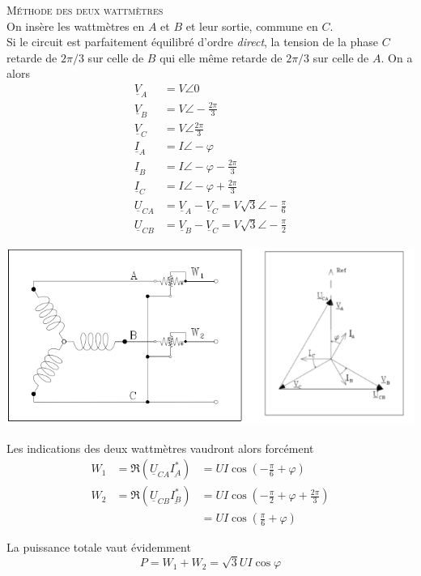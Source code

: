 			\textsc{Méthode des deux wattmètres}\\
			On insère les wattmètres en $A$ et $B$ et leur sortie, commune 
			en $C$.\\
			Si le circuit est parfaitement équilibré d'ordre \textit{direct}, 
			la tension de la phase $C$ retarde de $2\pi/3$ sur celle de $B$ 
			qui elle même retarde de $2\pi/3$ sur celle de $A$. On a alors
			\begin{equation}
			\begin{array}{lll}
			\underline{V}_A &= V \angle 0\\
			\underline{V}_B &= V\angle-\frac{2\pi}{3}\\
			\underline{V}_C &= V\angle\frac{2\pi}{3}\\
			\underline{I}_A &= I\angle-\varphi\\
			\underline{I}_B &= I\angle-\varphi-\frac{2\pi}{3}\\
			\underline{I}_C &= I\angle-\varphi+\frac{2\pi}{3}\\
			\underline{U}_{CA} &= \underline{V}_A-\underline{V}_C = V\sqrt{3}
			\angle-\frac{\pi}{6}\\
			\underline{U}_{CB} &= \underline{V}_B-\underline{V}_C = V\sqrt{3
			}\angle-\frac{\pi}{2}			
			\end{array}
			\end{equation}
				\begin{center}
		\includegraphics[scale=0.5]{ch1/image14.png}
		\end{center}
			Les indications des deux wattmètres vaudront alors forcément
			\begin{equation}
			\begin{array}{lll}
			W_1 &= \Re(\underline{U}_{CA}\underline{I_A^*}) &= UI\cos(-\frac{\pi}{
			6}+\varphi)\\
			W_2 &= \Re(\underline{U}_{CB}\underline{I_B^*}) &= UI\cos(-\frac{\pi}{
			2}+\varphi+\frac{2\pi}{3})	\\
			& &= UI\cos(\frac{\pi}{6}+\varphi)
			\end{array}
			\end{equation}
			
			La puissance totale vaut évidemment 
			\begin{equation}
			P = W_1+W_2 = \sqrt{3}UI\cos\varphi
			\end{equation}
		
		
		
		
		
		
		
		
		
		
		
		
		
		
		
		
		
		